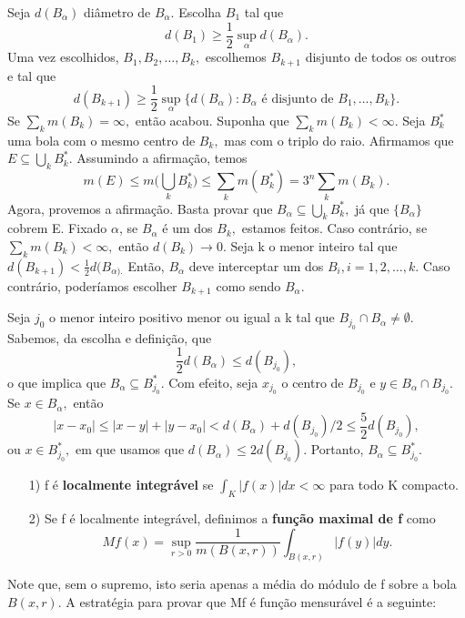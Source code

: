 \documentclass[measure_theory.tex]{subfiles}
\begin{document}
\begin{proof*}
	Seja \(d(B_{\alpha })\) diâmetro de \(B_{\alpha }.\) Escolha \(B_1\) tal que
	\[
		d(B_{1}) \geq \frac{1}{2}\sup_{\alpha }d(B_{\alpha }).
	\]
	Uma vez escolhidos, \(B_1, B_2, \dotsc , B_{k},\) escolhemos \(B_{k+1}\) disjunto de todos os outros e tal que
	\[
		d(B_{k+1}) \geq \frac{1}{2}\sup_{\alpha }\{d(B_{\alpha }): B_{\alpha } \text{ é disjunto de }B_1,\dotsc ,B_{k}\}.
	\]
	Se \(\sum\limits_{k}^{}m(B_{k}) = \infty,\) então acabou. Suponha que \(\sum\limits_{k}^{}m(B_{k}) < \infty\). Seja \(B_{k}^{*}\) uma bola com o mesmo centro de \(B_{k},\) mas com o triplo do raio. Afirmamos que
	\(E\subseteq \bigcup_{k}^{}B_{k}^{*}\). Assumindo a afirmação, temos
	\[
		m(E) \leq m \biggl(\bigcup_{k}^{}B_{k}^{*}\biggr) \leq \sum\limits_{k}^{}m(B_{k}^{*}) = 3^{n}\sum\limits_{k}^{}m(B_{k}).
	\]
	Agora, provemos a afirmação. Basta provar que \(B_{\alpha }\subseteq \bigcup_{k}^{}B_{k}^{*}, \) já que \(\{B_{\alpha }\}\) cobrem E. Fixado \(\alpha \), se \(B_{\alpha }\) é um dos \(B_{k},\) estamos feitos. Caso contrário,
	se \(\sum\limits_{k}^{}m(B_{k}) < \infty,\) então \(d(B_{k})\to 0\). Seja k o menor inteiro tal que \(d(B_{k+1}) < \frac{1}{2}d(B_{\alpha ).}\) Então, \(B_{\alpha }\) deve interceptar um dos \(B_{i}, i = 1, 2, \dotsc, k\). Caso contrário, poderíamos escolher \(B_{k+1}\) como sendo \(B_{\alpha }.\)

	Seja \(j_{0}\) o menor inteiro positivo menor ou igual a k tal que \(B_{j_{0}}\cap B_{\alpha }\neq\emptyset.\) Sabemos, da escolha e definição, que
	\[
		\frac{1}{2}d(B_{\alpha }) \leq d(B_{j_{0}}),
	\]
	o que implica que \(B_{\alpha }\subseteq B_{j_{0}}^{*}\). Com efeito, seja \(x_{j_{0}}\) o centro de \(B_{j_{0}}\) e \(y\in B_{\alpha }\cap B_{j_{0}}.\) Se \(x\in B_{\alpha},\) então
	\[
		|x-x_{0}|\leq |x-y| + |y-x_{0}| < d(B_{\alpha }) + d(B_{j_{0}})/2 \leq \frac{5}{2}d(B_{j_{0}}),
	\]
	ou \(x\in B_{j_{0}}^{*},\) em que usamos que \(d(B_\alpha ) \leq 2d(B_{j_{0}}).\) Portanto, \(B_{\alpha }\subseteq B_{j_{0}}^{*}.\) \qedsymbol
\end{proof*}
\begin{def*}
	\begin{itemize}
		\item[1)] f é \textbf{localmente integrável} se \(\int_{K}|f(x)| dx < \infty\) para todo K compacto.
		\item[2)] Se f é localmente integrável, definimos a \textbf{função maximal de f} como
		      \[
			      Mf(x) = \sup_{r > 0}\frac{1}{m(B(x, r))}\int_{B(x, r)}|f(y)| dy.
		      \]
	\end{itemize}
\end{def*}
Note que, sem o supremo, isto seria apenas a média do módulo de f sobre a bola \(B(x, r).\) A estratégia para provar que Mf é função mensurável é a seguinte:
\end{document}
